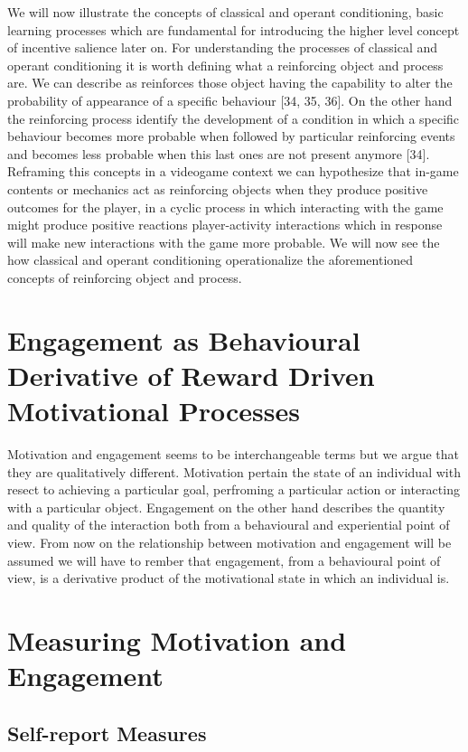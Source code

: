 We will now illustrate the concepts of classical and operant conditioning, basic learning processes which are fundamental for introducing the higher level concept of incentive salience later on. For understanding the processes of classical and operant conditioning it is worth defining what a reinforcing object and process are. We can describe as reinforces those object having the capability to alter the probability of appearance of a specific behaviour [34, 35, 36].  On the other hand the reinforcing process identify the development of a condition in which a specific behaviour becomes more probable when followed by particular reinforcing events and becomes less probable when this last ones are not present anymore [34]. Reframing this concepts in a videogame context we can hypothesize that in-game contents or mechanics act as reinforcing objects when they produce positive outcomes for the player, in a cyclic process in which interacting with the game might produce positive reactions player-activity interactions which in response will make new interactions with the game more probable. 
We will now see the how classical and operant conditioning operationalize the aforementioned concepts of reinforcing object and process.

\section{Engagement as Behavioural Derivative of Reward Driven Motivational Processes}
Motivation and engagement seems to be interchangeable terms but we argue that they are qualitatively different. Motivation pertain the state of an individual with resect to achieving a particular goal, perfroming a particular action or interacting with a particular object. Engagement on the other hand describes the quantity and quality of the interaction both from a behavioural and experiential point of view. From now on the relationship between motivation and engagement will be assumed we will have to rember that engagement, from a behavioural point of view, is a derivative product of the motivational state in which an individual is. 

\section{Measuring Motivation and Engagement}
\label{measuring_motivation_engagement}
\lorem
    \subsection{Self-report Measures}
    \label{self_report}
    \lorem

